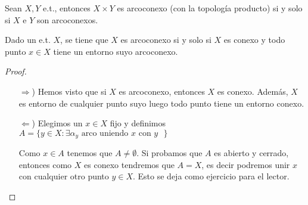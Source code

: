 \begin{teo}
    Sean $X,Y$ e.t., entonces $X\times Y$ es arcoconexo (con la topología producto) si y solo si $X$ e $Y$ son arcoconexos.
\end{teo}

\begin{teo}
    Dado un e.t. $X$, se tiene que $X$ es arcoconexo si y solo si $X$ es conexo y todo punto $x\in X$ tiene un entorno suyo arcoconexo.

    \begin{proof}\
        \begin{itemize}
            \item[$\Rightarrow$)] Hemos visto que si $X$ es arcoconexo, entonces $X$ es conexo. Además, $X$ es entorno de cualquier punto suyo luego todo punto tiene un entorno conexo.
            \item[$\Leftarrow$)] Elegimos un $x\in X$ fijo y definimos $A = \{y\in X : \exists \alpha_y \text{ arco uniendo $x$ con $y$ }\}$
            
            Como $x\in A$ tenemos que $A\neq \emptyset$. Si probamos que $A$ es abierto y cerrado, entonces como $X$ es conexo tendremos que $A=X$, es decir podremos unir $x$ con cualquier otro punto $y\in X$. Esto se deja como ejercicio para el lector.\\
        \end{itemize}
    \end{proof}
\end{teo}